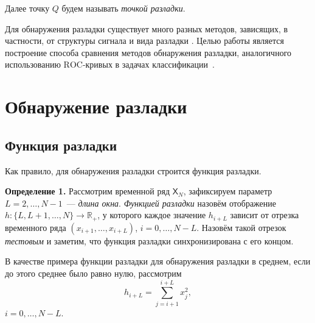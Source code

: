 \documentclass{math-mech-sci}
\newcommand{\X}{\mathsf X}
\begin{document}
Далее точку $Q$ будем называть \textit{точкой разладки}.

Для обнаружения разладки существует много разных методов, зависящих, в частности, от структуры сигнала и вида разладки \cite{cusum,ssach}. Целью работы является построение способа сравнения методов обнаружения разладки, аналогичного использованию $\mathrm{ROC}$-кривых в задачах классификации~\cite{roc}.

\section{Обнаружение разладки}
\subsection{Функция разладки}
Как правило, для обнаружения разладки строится функция разладки. %

\textbf{Определение 1.} Рассмотрим временной ряд $\X_N$, зафиксируем параметр $L=2,\ldots,N-1$~--- \textit{длина окна}. \textit{Функцией разладки} назовём отображение $h:\{L,L+1,\ldots,N\}\to\mathbb{R}_+$, у которого каждое значение $h_{i+L}$ зависит от отрезка временного ряда $(x_{i+1},\ldots,x_{i+L})$, $i=0,\ldots,N-L$. Назовём такой отрезок \textit{тестовым} и заметим, что функция разладки синхронизирована с его концом.

В качестве примера функции разладки для обнаружения разладки в среднем, если до этого среднее было равно нулю, рассмотрим
\begin{equation}\label{eq:h}
	h_{i+L}=\sum\limits_{j=i+1}^{i+L}x_j^2,
\end{equation}
$i=0,\ldots,N-L$.

\end{document}
